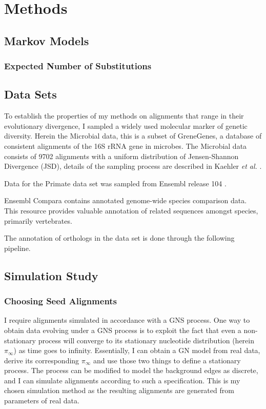 \chapter{Methods}

\section{Markov Models}

\subsection{Expected Number of Substitutions}

\section{Data Sets}

To establish the properties of my methods on alignments that range in their evolutionary divergence, I sampled a widely used molecular marker of genetic diversity. Herein the Microbial data, this is a subset of GreneGenes, a database of consistent alignments of the 16S rRNA gene in microbes. The Microbial data consists of 9702 alignments with a uniform distribution of Jensen-Shannon Divergence (JSD), details of the sampling process are described in Kaehler \textit{et al.} \cite{Kaehler2015}. 

Data for the Primate data set was sampled from Ensembl release 104 \cite{Howe2021Ensembl2021}. 



Ensembl Compara \cite{Howe2021Ensembl2021} contains annotated genome-wide species comparison data. This resource provides valuable annotation of related sequences amongst species, primarily vertebrates. 


The annotation of orthologs in the data set is done through the following pipeline. 

\section{Simulation Study}

\subsection{Choosing Seed Alignments}
I require alignments simulated in accordance with a GNS process. One way to obtain data evolving under a GNS process is to exploit the fact that even a non-stationary process will converge to its stationary nucleotide distribution (herein $\pi_{\infty}$) as time goes to infinity. Essentially, I can obtain a GN model from real data, derive its corresponding $\pi_{\infty}$ and use those two things to define a stationary process. The process can be modified to model the background edges as discrete, and I can simulate alignments according to such a specification. This is my chosen simulation method as the resulting alignments are generated from parameters of real data. 

